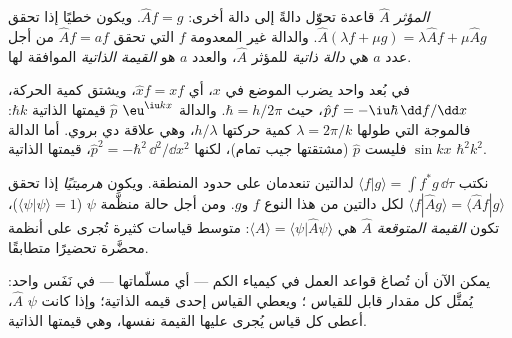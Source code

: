 \begin{definition}\label{def:b3:quantum-model-systems:operator}
\emph{المؤثر} $\hat A$ قاعدة تحوّل دالةً إلى دالة أخرى:
$\hat A f = g$. ويكون خطيًا إذا تحقق $\hat A(\lambda f +
\mu g) = \lambda\hat Af + \mu\hat Ag$. والدالة غير المعدومة $f$ التي تحقق
$\hat Af = a f$ من أجل عدد $a$ هي \emph{دالة ذاتية}
للمؤثر $\hat A$، والعدد $a$ هو \emph{القيمة الذاتية} الموافقة لها.
\end{definition}

\begin{example}\label{ex:b3:quantum-model-systems:xp}
في بُعد واحد يضرب  الموضع في $x$، أي $\hat x f = xf$،
ويشتق  كمية الحركة، $\hat p f = -\iu\hbar\,
\dd f/\dd x$، حيث $\hbar = h/2\pi$. والدالة $\eu^{\iu kx}$
  $\hat p$ قيمتها الذاتية $\hbar k$: فالموجة التي طولها
$\lambda = 2\pi/k$ كمية حركتها $h/\lambda$، وهي علاقة دي بروي.
أما الدالة $\sin kx$ فليست   $\hat p$ (مشتقتها
جيب تمام)، لكنها   $\hat p^2 = -\hbar^2\,\dd^2/\dd x^2$، قيمتها
الذاتية $\hbar^2k^2$.
\end{example}

\begin{definition}\label{def:b3:quantum-model-systems:hermitian}
نكتب $\langle f|g\rangle = \int f^*g\,\dd\tau$ لدالتين تنعدمان
على حدود المنطقة. ويكون  \emph{هرميتيًا}
إذا تحقق $\langle f|\hat Ag\rangle = \langle \hat Af|g\rangle$ لكل دالتين من هذا النوع
$f$ و$g$. ومن أجل حالة منظَّمة $\psi$ ($\langle\psi|\psi\rangle = 1$)، تكون
\emph{القيمة المتوقعة}  $\hat A$ هي
$\langle A\rangle = \langle\psi|\hat A\psi\rangle$: متوسط قياسات
كثيرة تُجرى على أنظمة محضَّرة تحضيرًا متطابقًا.
\end{definition}

يمكن الآن أن تُصاغ قواعد العمل في كيمياء الكم --- أي مسلّماتها --- في
نَفَس واحد: يُمثَّل كل مقدار قابل للقياس ؛ ويعطي القياس إحدى قيمه الذاتية؛ وإذا كانت
$\psi$   $\hat A$، أعطى كل قياس يُجرى عليها
القيمة نفسها، وهي قيمتها الذاتية.

